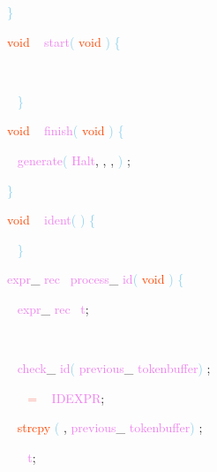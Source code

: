 \documentclass[8, usernames, dvipsnames]{beamer}
\begin{document}
\begin{frame}
\textcolor{SkyBlue}{\} }

 
 \textcolor{OrangeRed}{void}
\textcolor{White}{\ }
\textcolor{Violet}{start}\textcolor{SkyBlue}{(}
\textcolor{OrangeRed}{void}
\textcolor{SkyBlue}{)}
\textcolor{SkyBlue}{\{ }

 \textcolor{White}{\   }

 \textcolor{White}{\   }
\textcolor{SkyBlue}{\} }

 
 \textcolor{OrangeRed}{void}
\textcolor{White}{\ }
\textcolor{Violet}{finish}\textcolor{SkyBlue}{(}
\textcolor{OrangeRed}{void}
\textcolor{SkyBlue}{)}
\textcolor{SkyBlue}{\{ }

 \textcolor{White}{\   }
\textcolor{Violet}{generate}\textcolor{SkyBlue}{(}
\textcolor{Violet}{Halt}\textcolor{Sepia}{,}
\textcolor{Sepia}{,}
\textcolor{Sepia}{,}
\textcolor{SkyBlue}{)}
\textcolor{Sepia}{;}

 \textcolor{SkyBlue}{\} }

 
 \end{frame}
\begin{frame}
\textcolor{OrangeRed}{void}
\textcolor{White}{\ }
\textcolor{Violet}{ident}\textcolor{SkyBlue}{(}
\textcolor{SkyBlue}{)}
\textcolor{SkyBlue}{\{ }

 \textcolor{White}{\   }
\textcolor{SkyBlue}{\} }

 
 \textcolor{Violet}{expr}\textcolor{Sepia}{\_}
\textcolor{Violet}{rec}\textcolor{White}{\ }
\textcolor{Violet}{process}\textcolor{Sepia}{\_}
\textcolor{Violet}{id}\textcolor{SkyBlue}{(}
\textcolor{OrangeRed}{void}
\textcolor{SkyBlue}{)}
\textcolor{SkyBlue}{\{ }

 \textcolor{White}{\   }
\textcolor{Violet}{expr}\textcolor{Sepia}{\_}
\textcolor{Violet}{rec}\textcolor{White}{\ }
\textcolor{Violet}{t}\textcolor{Sepia}{;}

 \textcolor{White}{\   }

 \textcolor{White}{\   }
\textcolor{Violet}{check}\textcolor{Sepia}{\_}
\textcolor{Violet}{id}\textcolor{SkyBlue}{(}
\textcolor{Violet}{previous}\textcolor{Sepia}{\_}
\textcolor{Violet}{tokenbuffer}\textcolor{SkyBlue}{)}
\textcolor{Sepia}{;}

 \textcolor{White}{\   }
\textcolor{White}{\ }
\textcolor{Salmon}{=}
\textcolor{White}{\ }
\textcolor{Violet}{IDEXPR}\textcolor{Sepia}{;}

 \textcolor{White}{\   }
\textcolor{OrangeRed}{strcpy}
\textcolor{SkyBlue}{(}
\textcolor{Sepia}{,}
\textcolor{Violet}{previous}\textcolor{Sepia}{\_}
\textcolor{Violet}{tokenbuffer}\textcolor{SkyBlue}{)}
\textcolor{Sepia}{;}

 \textcolor{White}{\   }
\textcolor{OrangeRed}{	}
\textcolor{White}{\ }
\textcolor{Violet}{t}\textcolor{Sepia}{;}

 \end{frame}
\end{document}
